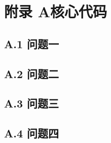 \documentclass[a4paper, 12pt]{ctexart}
\begin{document}
% 

\newpage
{}



\newpage













\newpage
\printbibliography[title={参考文献}]

\newpage
\appendix

\section{\texorpdfstring{附录 A\quad 核心代码}{附录 A 核心代码}}

\subsection*{A.1 问题一}


\subsection*{A.2 问题二}


\subsection*{A.3 问题三}


\subsection*{A.4 问题四}

\end{document}
